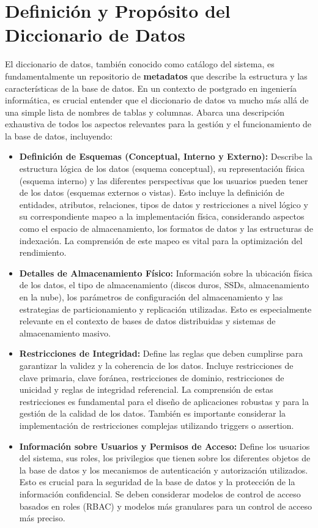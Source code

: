 \section{Definición y Propósito del Diccionario de Datos}

El diccionario de datos, también conocido como catálogo del sistema, es fundamentalmente un repositorio de \textbf{metadatos} que describe la estructura y las características de la base de datos. En un contexto de postgrado en ingeniería informática, es crucial entender que el diccionario de datos va mucho más allá de una simple lista de nombres de tablas y columnas. Abarca una descripción exhaustiva de todos los aspectos relevantes para la gestión y el funcionamiento de la base de datos, incluyendo:

\begin{itemize}
    \item \textbf{Definición de Esquemas (Conceptual, Interno y Externo):}  Describe la estructura lógica de los datos (esquema conceptual), su representación física (esquema interno) y las diferentes perspectivas que los usuarios pueden tener de los datos (esquemas externos o vistas).  Esto incluye la definición de entidades, atributos, relaciones, tipos de datos y restricciones a nivel lógico y su correspondiente mapeo a la implementación física, considerando aspectos como el espacio de almacenamiento, los formatos de datos y las estructuras de indexación. La comprensión de este mapeo es vital para la optimización del rendimiento.
    \item \textbf{Detalles de Almacenamiento Físico:}  Información sobre la ubicación física de los datos, el tipo de almacenamiento (discos duros, SSDs, almacenamiento en la nube), los parámetros de configuración del almacenamiento y las estrategias de particionamiento y replicación utilizadas.  Esto es especialmente relevante en el contexto de bases de datos distribuidas y sistemas de almacenamiento masivo.
    \item \textbf{Restricciones de Integridad:} Define las reglas que deben cumplirse para garantizar la validez y la coherencia de los datos.  Incluye restricciones de clave primaria, clave foránea, restricciones de dominio, restricciones de unicidad y reglas de integridad referencial.  La comprensión de estas restricciones es fundamental para el diseño de aplicaciones robustas y para la gestión de la calidad de los datos.  También es importante considerar la implementación de restricciones complejas utilizando triggers o assertion.
    \item \textbf{Información sobre Usuarios y Permisos de Acceso:}  Define los usuarios del sistema, sus roles, los privilegios que tienen sobre los diferentes objetos de la base de datos y los mecanismos de autenticación y autorización utilizados.  Esto es crucial para la seguridad de la base de datos y la protección de la información confidencial.  Se deben considerar modelos de control de acceso basados en roles (RBAC) y modelos más granulares para un control de acceso más preciso.

\end{itemize}
